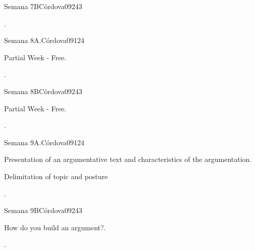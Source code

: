 \begin{syllabus}
\begin{unit}{}{Semana 7B}{Córdova09}{24}{3}
   \begin{learningoutcomes}
      \item . 
      \end{learningoutcomes}
\end{unit}


\begin{unit}{}{Semana 8A.}{Córdova09}{12}{4}
   \begin{topics}
      \item Partial Week - Free.
   \end{topics}
   \begin{learningoutcomes}
      \item .
   \end{learningoutcomes}
\end{unit}

\begin{unit}{}{Semana 8B}{Córdova09}{24}{3}
   \begin{topics}
      \item Partial Week - Free.
   \end{topics}

   \begin{learningoutcomes}
      \item .
      \end{learningoutcomes}
\end{unit}


\begin{unit}{}{Semana 9A.}{Córdova09}{12}{4}
   \begin{topics}
      \item Presentation of an argumentative text and characteristics of the argumentation.
      \item Delimitation of topic and posture

   \end{topics}
   \begin{learningoutcomes}
      \item .
   \end{learningoutcomes}
\end{unit}

\begin{unit}{}{Semana 9B}{Córdova09}{24}{3}
   \begin{topics}
      \item How do you build an argument?.
   \end{topics}

   \begin{learningoutcomes}
      \item .
      \end{learningoutcomes}
\end{unit}



\end{syllabus}
